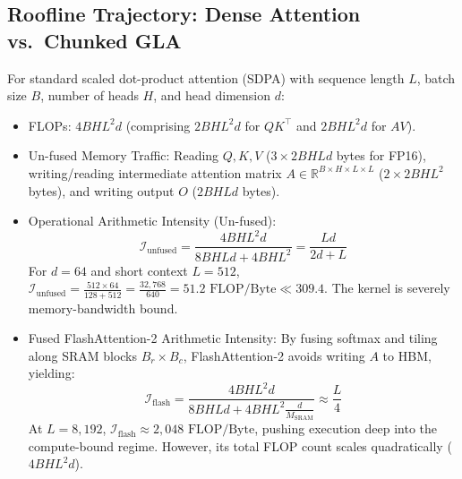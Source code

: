 \documentclass{article}
\begin{document}
\subsection{Roofline Trajectory: Dense Attention vs.\ Chunked GLA}
For standard scaled dot-product attention (SDPA) with sequence length $L$, batch size $B$, number of heads $H$, and head dimension $d$:
\begin{itemize}
    \item FLOPs: $4 B H L^2 d$ (comprising $2 B H L^2 d$ for $Q K^\top$ and $2 B H L^2 d$ for $A V$).
    \item Un-fused Memory Traffic: Reading $Q, K, V$ ($3 \times 2 B H L d$ bytes for FP16), writing/reading intermediate attention matrix $A \in \mathbb{R}^{B \times H \times L \times L}$ ($2 \times 2 B H L^2$ bytes), and writing output $O$ ($2 B H L d$ bytes).
    \item Operational Arithmetic Intensity (Un-fused):
    \begin{equation}
        \mathcal{I}_{\text{unfused}} = \frac{4 B H L^2 d}{8 B H L d + 4 B H L^2} = \frac{L d}{2 d + L}
    \end{equation}
    For $d=64$ and short context $L=512$, $\mathcal{I}_{\text{unfused}} = \frac{512 \times 64}{128 + 512} = \frac{32,768}{640} = 51.2 \text{ FLOP/Byte} \ll 309.4$. The kernel is severely memory-bandwidth bound.
    \item Fused FlashAttention-2 Arithmetic Intensity:
    By fusing softmax and tiling along SRAM blocks $B_r \times B_c$, FlashAttention-2 avoids writing $A$ to HBM, yielding:
    \begin{equation}
        \mathcal{I}_{\text{flash}} = \frac{4 B H L^2 d}{8 B H L d + 4 B H L^2 \frac{d}{M_{\text{SRAM}}}} \approx \frac{L}{4}
    \end{equation}
    At $L=8,192$, $\mathcal{I}_{\text{flash}} \approx 2,048 \text{ FLOP/Byte}$, pushing execution deep into the compute-bound regime. However, its total FLOP count scales quadratically ($4 B H L^2 d$).
\end{itemize}
\end{document}
